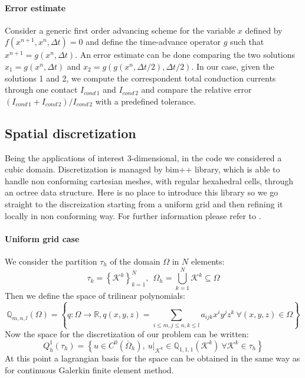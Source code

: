 \documentclass[11pt,a4paper]{article}
\begin{document}
\paragraph{Error estimate} Consider a generic first order advancing scheme for the variable \(x\) defined by \(f(x^{n+1},x^n, \Delta t)=0\) and define the time-advance operator \(g\) such that \(x^{n+1}=g(x^n,\Delta t)\). An error estimate can be done comparing the two solutions \(x_1=g(x^n,\Delta t)\) and \(x_2=g(g(x^n,\Delta t/2),\Delta t/2)\). In our case, given the solutions 1 and 2, we compute the correspondent total conduction currents through one contact \(I_{cond\, 1}\) and \(I_{cond\,2}\) and compare the relative error \((I_{cond\,1}+I_{cond\,2})/I_{cond\,2}\) with a predefined tolerance.

\subsection{Spatial discretization}
Being the applications of interest 3-dimensional, in the code we considered a cubic domain. Discretization is managed by bim++ library, which is able to handle non conforming cartesian meshes, with regular hexahedral cells, through an octree data structure. Here is no place to introduce this library so we go straight to the discreization starting from a uniform grid and then refining it locally in non conforming way. For further information please refer to \cite{thesis-pasquale-africa}. 
\paragraph{Uniform grid case}
We consider the partition \(\tau_h\) of the domain \(\Omega\) in \(N\) elements:
\begin{equation}
	\tau_k=\left\{\mathcal{K}^k\right\}_{k=1}^N,\ \ \Omega_h=\bigcup_{k=1}^N \mathcal{K}^k \subseteq \Omega
\end{equation}
Then we define the space of trilinear polynomials:
\begin{equation}
	\mathbb{Q}_{m,n,l}(\Omega)=\left\{q:\Omega\rightarrow\mathbb{R}, q(x,y,z)=\sum_{i\leq m,j\leq n,k\leq l}a_{ijk}x^iy^jz^k\ \forall (x,y,z)\in\Omega \right\}
\end{equation}
Now the space for the discretization of our problem can be written:
\begin{equation}
	Q_h^1(\tau_h) = \left\{u\in C^0\left(\overline{\Omega}_h\right),\ u|_{\mathcal{K}^k}\in\mathbb{Q}_{1,1,1}\left(\mathcal{K}^k\right)\ \forall \mathcal{K}^k\in \tau_h \right\}
\end{equation}
At this point a lagrangian basis for the space can be obtained in the same way as for continuous Galerkin finite element method.
\end{document}
